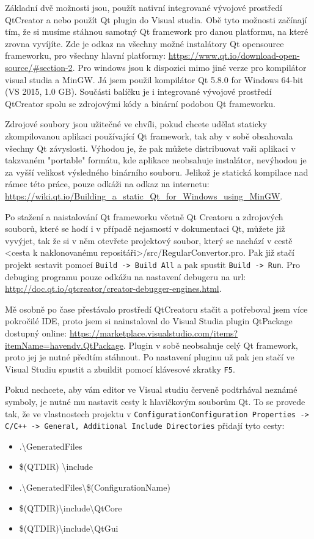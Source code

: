 Základní dvě možnosti jsou, použít nativní integrované vývojové prostředí QtCreator a nebo použít Qt plugin do Visual studia. Obě tyto možnosti začínají tím, že si musíme stáhnou samotný Qt framework pro danou platformu, na které zrovna vyvíjíte. Zde je odkaz na všechny možné instalátory Qt opensource frameworku, pro všechny hlavní platformy: \url{https://www.qt.io/download-open-source/#section-2}. Pro windows jsou k dispozici mimo jiné verze pro kompilátor visual studia a MinGW. Já jsem použil kompilátor Qt 5.8.0 for Windows 64-bit (VS 2015, 1.0 GB). Součásti balíčku je i integrované vývojové prostředí QtCreator spolu se zdrojovými kódy a binární podobou Qt frameworku. 

Zdrojové soubory jsou užitečné ve chvíli, pokud chcete udělat staticky zkompilovanou aplikaci používající Qt framework, tak aby v sobě obsahovala všechny Qt závyslosti. Výhodou je, že pak můžete distribuovat vaši aplikaci v takzvaném "portable" formátu, kde aplikace neobsahuje instalátor, nevýhodou je za vyšší velikost výsledného binárního souboru. Jelikož je statická kompilace nad rámec této práce, pouze odkáži na odkaz na internetu: \url{https://wiki.qt.io/Building_a_static_Qt_for_Windows_using_MinGW}.

Po stažení a naistalování Qt frameworku včetně Qt Creatoru a zdrojových souborů, které se hodí i v případě nejasností v dokumentaci Qt, můžete již vyvýjet, tak že si v něm otevřete projektový soubor, který se nachází v cestě <cesta k naklonovanému repositáři>/src/RegularConvertor.pro. Pak již stačí projekt sestavit pomocí \texttt{Build -> Build All} a pak spustit \texttt{Build -> Run}. Pro debuging programu pouze odkážu na nastavení debugeru na url: \url{http://doc.qt.io/qtcreator/creator-debugger-engines.html}.   

Mě osobně po čase přestávalo prostředí QtCreatoru stačit a potřeboval jsem více pokročilé IDE, proto jsem si nainstaloval do Visual Studia plugin QtPackage dostupný online: \url{https://marketplace.visualstudio.com/items?itemName=havendv.QtPackage}. Plugin v sobě neobsahuje celý Qt framework, proto jej je nutné předtím stáhnout. Po nastavení pluginu už pak jen stačí ve Visual Studiu spustit a zbuildit pomocí klávesové zkratky \texttt{F5}.

Pokud nechcete, aby vám editor ve Visual studiu červeně podtrhával neznámé symboly, je nutné mu nastavit cesty k hlavičkovým souborům Qt. To se provede tak, že ve vlastnostech projektu v \texttt{ConfigurationConfiguration Properties -> C/C++ -> General, Additional Include Directories} přidají tyto cesty: 
\begin{itemize}
	\item .\textbackslash GeneratedFiles
	\item \$(QTDIR) \textbackslash include
	\item .\textbackslash GeneratedFiles\textbackslash\$(ConfigurationName)
	\item \$(QTDIR)\textbackslash include\textbackslash QtCore
	\item \$(QTDIR)\textbackslash include\textbackslash QtGui
\end{itemize}

